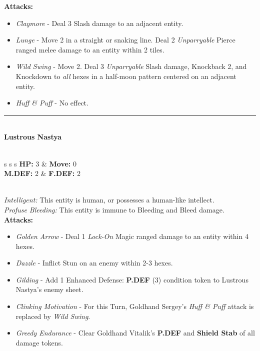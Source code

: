 \textbf{Attacks:}
\begin{itemize}
\item \emph{Claymore} -  Deal 3 Slash damage to an adjacent entity.
\item \emph{Lunge} - Move 2 in a straight or snaking line. Deal 2 \emph{Unparryable} Pierce ranged melee damage to an entity within 2 tiles.
\item \emph{Wild Swing} - Move 2. Deal 3 \emph{Unparryable} Slash damage, Knockback 2, and Knockdown to \emph{all} hexes in a half-moon pattern centered on an adjacent entity.
\item \emph{Huff \& Puff} - No effect.
\end{itemize}
\hrule
\ \\
{\large \textbf{Lustrous Nastya}}\\\\
\begin{tabular}{s s s}
\textbf{HP:} 3 & \textbf{Move:} 0\\
\textbf{M.DEF:} 2 & \textbf{F.DEF:} 2\\
\end{tabular}\\

\emph{Intelligent:} This entity is human, or possesses a human-like intellect.\\

\emph{Profuse Bleeding:} This entity is immune to Bleeding and Bleed damage.\\

\textbf{Attacks:}
\begin{itemize}
\item \emph{Golden Arrow} -  Deal 1 \emph{Lock-On} Magic ranged damage to an entity within 4 hexes.
\item \emph{Dazzle} - Inflict Stun on an enemy within 2-3 hexes.
\item \emph{Gilding} - Add 1 Enhanced Defense: \textbf{P.DEF} (3) condition token to Lustrous Nastya’s enemy sheet.
\item \emph{Clinking Motivation} - For this Turn, Goldhand Sergey’s \emph{Huff \& Puff} attack is replaced by \emph{Wild Swing}.
\item \emph{Greedy Endurance} - Clear Goldhand Vitalik’s \textbf{P.DEF} and \textbf{Shield Stab} of all damage tokens. 
\end{itemize}

\pagebreak

